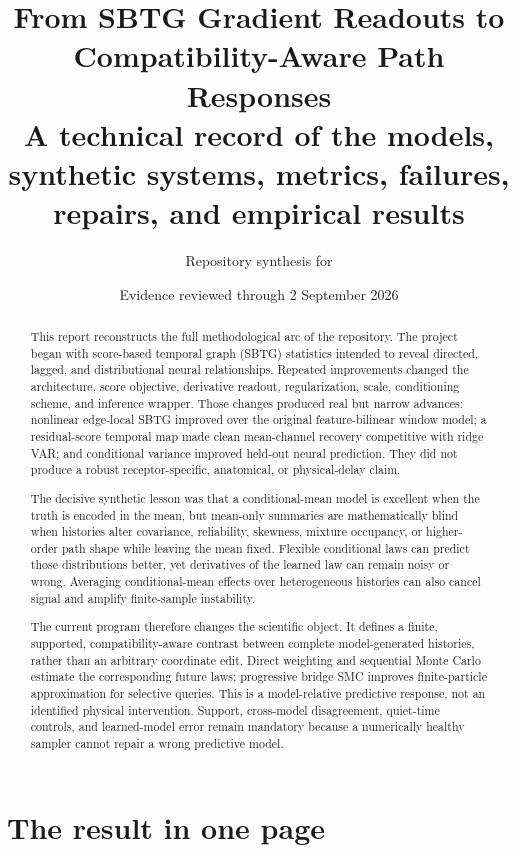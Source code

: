 \documentclass[10pt]{article}
\title{\vspace{-2.5em}\textbf{From SBTG Gradient Readouts to\\Compatibility-Aware Path Responses}\\[0.45em]
\large A technical record of the models, synthetic systems, metrics, failures, repairs, and empirical results}
\author{Repository synthesis for \code{new\_sbtg\_neuro}}
\date{Evidence reviewed through 2 September 2026}
\begin{document}
\maketitle

\begin{abstract}
This report reconstructs the full methodological arc of the repository. The project began with score-based temporal graph (SBTG) statistics intended to reveal directed, lagged, and distributional neural relationships. Repeated improvements changed the architecture, score objective, derivative readout, regularization, scale, conditioning scheme, and inference wrapper. Those changes produced real but narrow advances: nonlinear edge-local SBTG improved over the original feature-bilinear window model; a residual-score temporal map made clean mean-channel recovery competitive with ridge VAR; and conditional variance improved held-out neural prediction. They did not produce a robust receptor-specific, anatomical, or physical-delay claim.

The decisive synthetic lesson was that a conditional-mean model is excellent when the truth is encoded in the mean, but mean-only summaries are mathematically blind when histories alter covariance, reliability, skewness, mixture occupancy, or higher-order path shape while leaving the mean fixed. Flexible conditional laws can predict those distributions better, yet derivatives of the learned law can remain noisy or wrong. Averaging conditional-mean effects over heterogeneous histories can also cancel signal and amplify finite-sample instability.

The current program therefore changes the scientific object. It defines a finite, supported, compatibility-aware contrast between complete model-generated histories, rather than an arbitrary coordinate edit. Direct weighting and sequential Monte Carlo estimate the corresponding future laws; progressive bridge SMC improves finite-particle approximation for selective queries. This is a model-relative predictive response, not an identified physical intervention. Support, cross-model disagreement, quiet-time controls, and learned-model error remain mandatory because a numerically healthy sampler cannot repair a wrong predictive model.
\end{abstract}

\tableofcontents
\clearpage


\section{The result in one page}
\end{document}
